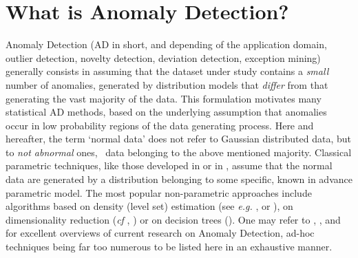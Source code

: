 \section{What is Anomaly Detection?}
Anomaly Detection (AD in short, and depending of the application domain, outlier detection, novelty detection, deviation detection, exception mining) generally consists in assuming that the dataset under study contains a \textit{small} number of anomalies, generated by distribution models that  \textit{differ} from that generating the vast majority of the data.
This formulation motivates many statistical AD methods, based on the underlying assumption that anomalies occur in low probability regions of the data generating process. Here and hereafter, the term `normal data' does not refer to Gaussian distributed data, but  to  \emph{not abnormal} ones, \ie~data belonging to the above mentioned majority. 
Classical parametric techniques, like those developed in \cite{Barnett94} or in \cite{Eskin2000}, assume that the normal data are generated by a distribution belonging to some  specific, known in advance parametric model.  
The most popular non-parametric approaches include algorithms based on density (level set) estimation (see \textit{e.g.} \cite{Scholkopf2001},  \cite{Scott2006} or \cite{Breunig2000LOF}), on dimensionality reduction (\textit{cf} \cite{Shyu2003}, \cite{Aggarwal2001}) or on decision trees (\cite{Liu2008}).
One may refer to \cite{Hodge2004survey}, \cite{Chandola2009survey}, \cite{Patcha2007survey} and \cite{Markou2003survey} for excellent overviews of current research on Anomaly Detection, ad-hoc techniques being far too numerous to be listed here in an exhaustive manner.



